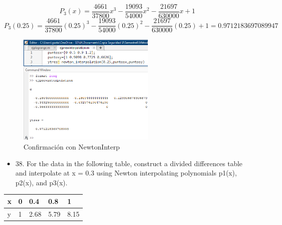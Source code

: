 \documentclass{article}
\begin{document}
\begin{equation*}
    P_3(x) =\frac{4661}{37800}x^{3}-\frac{19093}{54000}x^{2}-\frac{21697}{630000}x+1
\end{equation*}
\begin{equation*}
    P_3(0.25) =\frac{4661}{37800}(0.25)^{3}-\frac{19093}{54000}(0.25)^{2}-\frac{21697}{630000}(0.25)+1= \boxed{0.9712183697089947}
\end{equation*}

\begin{figure}[H]
    \centering
    \includegraphics[width=0.6\textwidth]{37a.png}
    \caption{Confirmación con NewtonInterp}
\end{figure}

\begin{itemize}
    \item 38. For the data in the following table, construct a divided differences
          table and interpolate at x = 0.3 using Newton interpolating
          polynomials p1(x), p2(x), and p3(x).
\end{itemize}

\begin{table}[h!]
    \begin{tabular}{|lllll|}
        \hline
        \multicolumn{1}{|p{30.865313pt}}{\raggedright x} & \multicolumn{1}{|p{30.865313pt}}{\raggedright 0} & \multicolumn{1}{|p{32.370937pt}}{\raggedright 0.4}  & \multicolumn{1}{|p{30.1125pt}}{\raggedright 0.8}  & \multicolumn{1}{|p{30.1125pt}|}{\raggedright 1}    \\
        \hline
        \multicolumn{1}{|p{30.865313pt}}{\raggedright y} & \multicolumn{1}{|p{30.865313pt}}{\raggedright 1} & \multicolumn{1}{|p{32.370937pt}}{\raggedright 2.68} & \multicolumn{1}{|p{30.1125pt}}{\raggedright 5.79} & \multicolumn{1}{|p{30.1125pt}|}{\raggedright 8.15} \\
        \hline
    \end{tabular}
\end{table}
\end{document}
